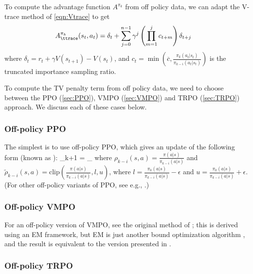 To compute the advantage function $A^{\pi_k}$
from off policy data, we can adapt the V-trace
method of \cref{eqn:Vtrace} to get
\begin{align}
  A_{\ttrace}^{\pi_k}(s_t,a_t)
  &= \delta_t
  + \sum_{j=0}^{n-1} \gamma^{j} \left( \prod_{m=1}^{j} c_{t+m}
  \right)   \delta_{t+j}
\end{align}
where
$\delta_t = r_t + \gamma V(s_{t+1}) - V(s_t)$,
and
$c_t = \min\left(\overline{c},
\frac{\pi_k(a_t|s_t)}{\pi_{k-i}(a_t|s_t)} \right)$
is the truncated importance sampling ratio.


To compute the TV penalty term from off policy data,
we need to choose between the PPO (\cref{sec:PPO}),
VMPO (\cref{sec:VMPO})
and TRPO (\cref{sec:TRPO}) approach.
We discuss each of these cases below.

\subsubsection{Off-policy PPO}

The simplest is to use off-policy PPO, which gives an update of the
following form (known as ):
\be
\pi_{k+1} = \argmax_{\pi} 
\ee
where $\rho_{k-i}(s,a)=\frac{\pi(a|s)}{\pi_{k-i}(a|s)}$
and
$\tilde{\rho}_{k-i}(s,a)=\text{clip}(\frac{\pi(a|s)}{\pi_{k-i}(a|s)},l,u)$,
where $l=\frac{\pi_k(a|s)}{\pi_{k-i}(a|s)} - \epsilon$
and $u=\frac{\pi_k(a|s)}{\pi_{k-i}(a|s)} + \epsilon$.
(For other off-policy variants of PPO,
see e.g., \citep{Meng2023,Li2024R3}.)

\subsubsection{Off-policy VMPO}

For an off-policy version of VMPO,
see  the original  method of \citep{Abdolmaleki2018};
this is derived using an EM framework,
but EM is just another bound optimization algorithm \citep{Hunter04},
and the result is equivalent to the version presented
in \cite{Queeney2024}.

\subsubsection{Off-policy TRPO}

